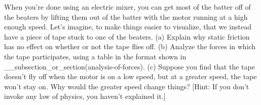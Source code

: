 When you're done using an electric mixer, you can get
most of the batter off of the beaters by lifting them out of
the batter with the motor running at a high enough speed.
Let's imagine, to make things easier to visualize, that we
instead have a piece of tape stuck to one of the beaters.\hwendpart
(a) Explain why static friction has no effect on whether or
not the tape flies off.\hwendpart
%
(b) Analyze the forces in which the tape participates, using
a table in the format shown in __subsection_or_section(analysis-of-forces).\hwendpart
(c) Suppose you find that the tape
doesn't fly off when the motor is on a low speed, but
at a greater speed, the tape won't stay on. Why would the
greater speed change things? [Hint: If you don't invoke any
law of physics, you haven't explained it.]
